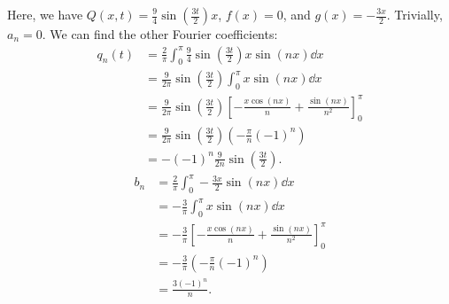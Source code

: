 \documentclass[plain]{pset}
\begin{document}
\begin{solution}
    Here, we have \(Q(x, t) = \frac{9}{4}\sin\left(\frac{3t}{2}\right)x\), \(f(x) = 0\), and \(g(x) = -\frac{3x}{2}\). Trivially, \(a_n = 0\). We can find the other Fourier coefficients:
    \begin{align*}
        q_n(t) & = \frac{2}{\pi} \int_0^\pi \frac{9}{4}\sin\left(\frac{3t}{2}\right)x \sin(nx) \dd{x}                          \\
               & = \frac{9}{2\pi} \sin\left(\frac{3t}{2}\right) \int_0^\pi x\sin(nx) \dd{x}                                    \\
               & = \frac{9}{2\pi} \sin\left(\frac{3t}{2}\right) \left[-\frac{x\cos(nx)}{n} + \frac{\sin(nx)}{n^2}\right]_0^\pi \\
               & = \frac{9}{2\pi} \sin\left(\frac{3t}{2}\right) \left(-\frac{\pi}{n}\left(-1\right)^n\right)                   \\
               & = -(-1)^n\frac{9}{2n}\sin\left(\frac{3t}{2}\right).
    \end{align*}
    \begin{align*}
        b_n & = \frac{2}{\pi} \int_0^\pi -\frac{3x}{2} \sin(nx) \dd{x}                        \\
            & = -\frac{3}{\pi} \int_0^\pi x\sin(nx) \dd{x}                                    \\
            & = -\frac{3}{\pi} \left[-\frac{x\cos(nx)}{n} + \frac{\sin(nx)}{n^2}\right]_0^\pi \\
            & = -\frac{3}{\pi} \left(-\frac{\pi}{n}\left(-1\right)^n\right)                   \\
            & = \frac{3(-1)^n}{n}.
    \end{align*}


\end{solution}
\end{document}
